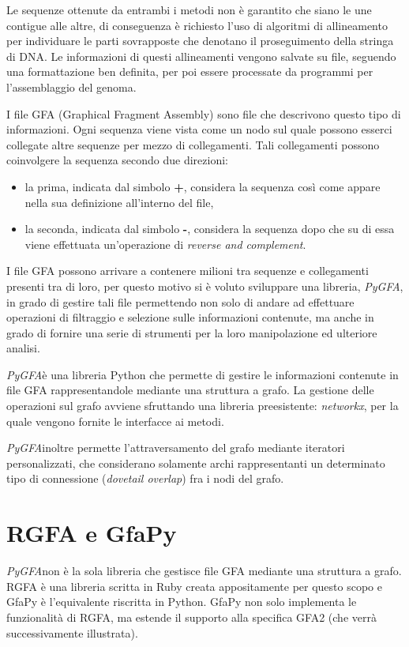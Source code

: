 \documentclass[11pt, a4paper]{book}
\newcommand {\pygfa} {\textit{PyGFA}}
\begin{document}
Le sequenze ottenute da entrambi i metodi non è garantito
che siano le une contigue alle altre, di conseguenza è richiesto
l'uso di algoritmi di allineamento per individuare le parti sovrapposte
che denotano il proseguimento della stringa di DNA. Le informazioni
di questi allineamenti vengono salvate su file, seguendo una formattazione
ben definita, per poi essere processate
da programmi per l'assemblaggio del genoma.


I file GFA\cite{gfa_spec} (Graphical Fragment Assembly) sono file che descrivono	
questo tipo di informazioni. Ogni sequenza
viene vista come un nodo sul quale possono esserci collegate altre
sequenze per mezzo di collegamenti. Tali collegamenti possono
coinvolgere la sequenza secondo due direzioni:
\begin{itemize}
	\item la prima, indicata dal simbolo \textbf{+}, considera la
	sequenza così come appare nella sua definizione all'interno del file,
	\item la seconda, indicata dal simbolo \textbf{-}, considera la
	sequenza dopo che su di essa viene effettuata un'operazione di
	\emph{reverse and complement}.
\end{itemize}

I file GFA possono arrivare a contenere milioni tra sequenze e collegamenti
presenti tra di loro, per questo motivo si è voluto sviluppare una libreria, \pygfa,
in grado di gestire tali file permettendo non solo di andare ad effettuare
operazioni di filtraggio e selezione sulle informazioni contenute, ma
anche in grado di fornire una serie di strumenti per la loro
manipolazione ed ulteriore analisi.

\pygfa è una libreria Python che permette di gestire le informazioni
contenute in file GFA rappresentandole mediante una struttura a grafo.
La gestione delle operazioni sul grafo avviene sfruttando una libreria
preesistente: \emph{networkx}\cite{networkx}, per la quale vengono
fornite le interfacce ai metodi.

\pygfa inoltre permette l'attraversamento del grafo mediante iteratori
personalizzati, che considerano solamente archi rappresentanti un
determinato tipo di connessione (\emph{dovetail overlap}) fra i nodi del
grafo.

\section{RGFA e GfaPy}
\pygfa non è la sola libreria che gestisce file GFA mediante una struttura a grafo.
RGFA è una libreria scritta in Ruby creata appositamente per questo scopo e GfaPy
è l'equivalente riscritta in Python. GfaPy non solo implementa le funzionalità di RGFA,
ma estende il supporto alla specifica GFA2 (che verrà successivamente illustrata).
\end{document}
